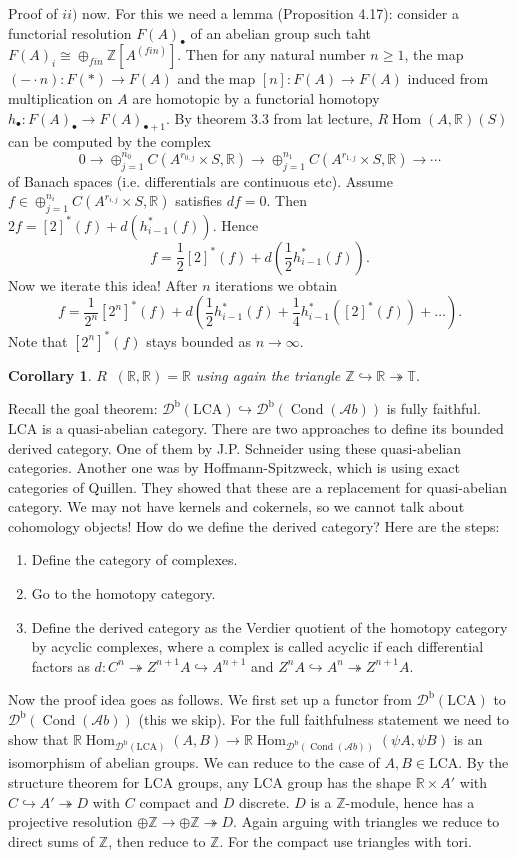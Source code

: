 \documentclass[12pt]{article}
\theoremstyle{darkgreentheorem}
\newtheorem{cor}[thm]{Corollary}
\theoremstyle{darkbluedefinition}
\theoremstyle{darkredexample}
\theoremstyle{remark}
\newcommand{\Z}{\mathbb{Z}}
\newcommand{\R}{\mathbb{R}}
\newcommand{\1}{\mathbbm{1}}
\newcommand{\bbT}{\mathbb{T}}
\newcommand{\Ab}{\mathscr{A}b}
\newcommand{\Db}{\mathscr{D}^{\mathrm{b}}}
\DeclareMathOperator{\Hom}{Hom}
\DeclareMathOperator{\Cond}{Cond}
\DeclareMathOperator{\ihom}{\underline{Hom}}
\newcommand{\op}{\oplus}
\newcommand{\tms}{\times}
\newcommand{\epi}{\twoheadrightarrow}
\newcommand{\mono}{\hookrightarrow}
\newcommand{\LCA}{\mathrm{LCA}}
\begin{document}
Proof of $ii)$ now.
For this we need a lemma (Proposition 4.17): consider a functorial resolution $F(A)_{\bullet}$ of an abelian group such taht $F(A)_{i}\cong \op_{fin}\Z[A^{(fin)}]$.
Then for any natural number $n\geqslant 1$, the map $(-\cdot n)\colon F(*)\to F(A)$ and the map $[n]\colon F(A)\to F(A)$ induced from multiplication on $A$ are homotopic by a functorial homotopy $h_{\bullet}\colon F(A)_{\bullet}\to F(A)_{\bullet +1}$.
By theorem 3.3 from lat lecture, $R\Hom(A,\R)(S)$ can be computed by the complex
\[ 0\to \op_{j=1}^{n_{0}}C(A^{r_{0,j}}\tms S,\R)\to \op_{j=1}^{n_{1}}C(A^{r_{1,j}}\tms S,\R)\to \cdots \]
of Banach spaces (i.e. differentials are continuous etc).
Assume $f\in \op_{j=1}^{n_{i}}C(A^{r_{i,j}}\tms S,\R)$ satisfies $df=0$.
Then $2f=[2]^{*}(f)+d(h_{i-1}^{*}(f))$.
Hence
\[ f=\frac{1}{2}[2]^{*}(f)+d(\frac{1}{2}h_{i-1}^{*}(f)).\]
Now we iterate this idea!
After $n$ iterations we obtain
\[ f=\frac{1}{2^{n}}[2^{n}]^{*}(f)+d(\frac{1}{2}h_{i-1}^{*}(f)+\frac{1}{4}h_{i-1}^{*}([2]^{*}(f))+\ldots ). \]
Note that $[2^{n}]^{*}(f)$ stays bounded as $n\to \infty$.

\begin{cor}
    $R\ihom(\R,\R)=\R$ using again the triangle $\Z\mono\R\epi\bbT$.
\end{cor}

Recall the goal theorem: $\Db(\LCA)\mono \Db(\Cond(\Ab))$ is fully faithful.
$\LCA$ is a quasi-abelian category.
There are two approaches to define its bounded derived category.
One of them by J.P. Schneider using these quasi-abelian categories.
Another one was by Hoffmann-Spitzweck, which is using exact categories of Quillen.
They showed that these are a replacement for quasi-abelian category.
We may not have kernels and cokernels, so we cannot talk about cohomology objects!
How do we define the derived category?
Here are the steps:

\begin{enumerate}
    \item Define the category of complexes.
    \item Go to the homotopy category.
    \item Define the derived category as the Verdier quotient of the homotopy category by acyclic complexes, where a complex is called acyclic if each differential factors as $d\colon C^{n}\epi Z^{n+1}A\mono A^{n+1}$ and $Z^{n}A\mono A^{n}\epi Z^{n+1}A$.
\end{enumerate}

Now the proof idea goes as follows.
We first set up a functor from $\Db(\LCA)$ to $\Db(\Cond(\Ab))$ (this we skip).
For the full faithfulness statement we need to show that $\R\Hom_{\Db(\LCA)}(A,B)\to \R\Hom_{\Db(\Cond(\Ab))}(\psi A,\psi B)$ is an isomorphism of abelian groups.
We can reduce to the case of $A,B\in \LCA$.
By the structure theorem for $\LCA$ groups, any $\LCA$ group has the shape $\R\tms A'$ with $C\mono A'\epi D$ with $C$ compact and $D$ discrete.
$D$ is a $\Z$-module, hence has a projective resolution $\op \Z\to \op \Z\epi D$.
Again arguing with triangles we reduce to direct sums of $\Z$, then reduce to $\Z$.
For the compact use triangles with tori.
\end{document}
